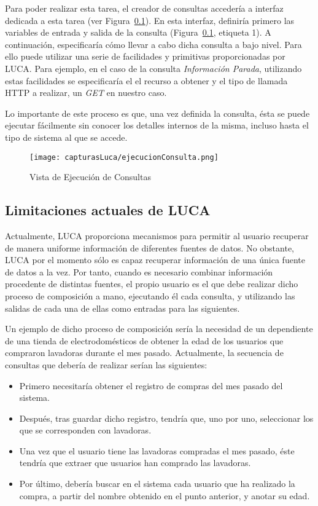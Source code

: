 Para poder realizar esta tarea, el creador de consultas accedería a interfaz dedicada a esta tarea (ver Figura~\ref{}). En esta interfaz, definiría primero las variables de entrada y salida de la consulta (Figura~\ref{}, etiqueta 1). A continuación, especificaría cómo llevar a cabo dicha consulta a bajo nivel. Para ello puede utilizar una serie de facilidades y primitivas proporcionadas por LUCA. Para ejemplo, en el caso de la consulta \emph{Información Parada}, utilizando estas facilidades se especificaría el el recurso a obtener y el tipo de llamada HTTP a realizar, un \emph{GET} en nuestro caso.

Lo importante de este proceso es que, una vez definida la consulta, ésta se puede ejecutar fácilmente sin conocer los detalles internos de la misma, incluso hasta el tipo de sistema al que se accede.


	\begin{figure}[!tb]
		\centering
		\texttt{[image: capturasLuca/ejecucionConsulta.png]}
		\caption{Vista de Ejecución de Consultas}\label{fig:ejecucionConsultas}
	\end{figure}

\subsection{Limitaciones actuales de LUCA}

Actualmente, LUCA proporciona mecanismos para permitir al usuario recuperar de manera uniforme información de diferentes fuentes de datos. No obstante, LUCA por el momento sólo es capaz recuperar información de una única fuente de datos a la vez. Por tanto, cuando es necesario combinar información procedente de distintas fuentes, el propio usuario es el que debe realizar dicho proceso de composición a mano, ejecutando él cada consulta, y utilizando las salidas de cada una de ellas como entradas para las siguientes.


Un ejemplo de dicho proceso de composición sería la necesidad de un dependiente de una tienda de electrodomésticos de obtener la edad de los usuarios que compraron lavadoras durante el mes pasado. Actualmente, la secuencia de consultas que debería de realizar serían las siguientes:

\begin{itemize}
	\item Primero necesitaría obtener el registro de compras del mes pasado del sistema.
	\item Después, tras guardar dicho registro, tendría que, uno por uno, seleccionar los que se corresponden con lavadoras.
	\item Una vez que el usuario tiene las lavadoras compradas el mes pasado, éste tendría que extraer que usuarios han comprado las lavadoras.
	\item Por último, debería buscar en el sistema cada usuario que ha realizado la compra, a partir del nombre obtenido en el punto anterior, y anotar su edad.
\end{itemize}


